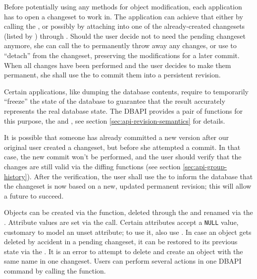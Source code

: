 \documentclass{article}
\begin{document}
Before potentially using any methods for object modification, each application has to open a changeset to work in.  The
application can achieve that either by calling the , or possibly by attaching into one of
the already-created changesets (listed by ) through .
Should the user decide not to need the pending changeset anymore, she can call the 
to permanently throw away any changes, or use  to ``detach'' from the
changeset, preserving the modifications for a later commit.  When all changes have been performed and the user decides to
make them permanent, she shall use the  to commit them into a persistent revision.

Certain applications, like dumping the database contents, require to temporarily ``freeze'' the state of the database to
guarantee that the result accurately represents the real database state.  The DBAPI provides a pair of functions for
this purpose, the  and , see section
\ref{sec:api-revision-semantics} for details.

It is possible that someone has already committed a new version after our original user created a changeset, but before
she attempted a commit.  In that case, the new commit won't be performed, and the user should verify that the changes are still
valid via the diffing functions (see section \ref{sec:api-group-history}).  After the verification, the user shall use the
 to inform the database that the changeset is now based on a new, updated permanent
revision; this will allow a future  to succeed.

Objects can be created via the  function, deleted through the  and
renamed via the .  Attribute values are set via the  call.
Certain attributes accept a {\tt NULL} value, customary to model an unset attribute; to use it, also use
.  In case an object gets deleted by accident in a pending changeset, it can be restored to
its previous state via the .  It is an error to attempt to delete and create an
object with the same name in one changeset.  Users can perform several actions in one DBAPI command by calling the
 function.
\end{document}
